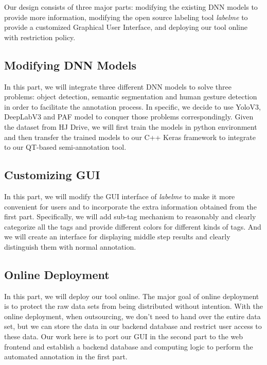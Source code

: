 Our design consists of three major parts: modifying the existing DNN models to provide more information, modifying the open source labeling tool \textit{labelme} to provide a customized Graphical User Interface, and deploying our tool online with restriction policy.

\subsection{Modifying DNN Models}
In this part, we will integrate three different DNN models to solve three problems: object detection, semantic segmentation and human gesture detection in order to facilitate the annotation process. In specific, we decide to use YoloV3, DeepLabV3 and PAF model to conquer those problems correspondingly. Given the dataset from HJ Drive, we will first train the models in python environment and then transfer the trained models to our C++ Keras framework to integrate to our QT-based semi-annotation tool.

\subsection{Customizing GUI}
In this part, we will modify the GUI interface of \textit{labelme} to make it more convenient for users and to incorporate the extra information obtained from the first part. Specifically, we will add sub-tag mechanism to reasonably and clearly categorize all the tags and provide different colors for different kinds of tags. And we will create an interface for displaying middle step results and clearly distinguish them with normal annotation.

\subsection{Online Deployment}
In this part, we will deploy our tool online. The major goal of online deployment is to protect the raw data sets from being distributed without intention. With the online deployment, when outsourcing, we don't need to hand over the entire data set, but we can store the data in our backend database and restrict user access to these data. Our work here is to port our GUI in the second part to the web frontend and establish a backend database and computing logic to perform the automated annotation in the first part.

